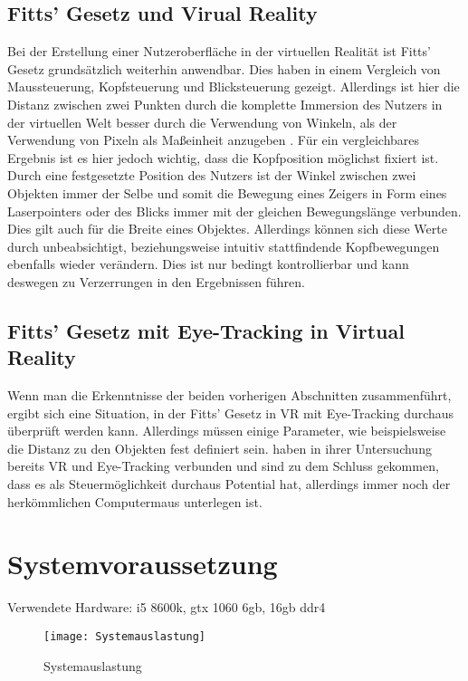 \subsection{Fitts' Gesetz und Virual Reality}
Bei der Erstellung einer Nutzeroberfläche in der virtuellen Realität ist Fitts' Gesetz grundsätzlich weiterhin anwendbar. Dies haben \citeauthor{Hansen.2018} in einem Vergleich von Maussteuerung, Kopfsteuerung und Blicksteuerung gezeigt.\cite{Hansen.2018} Allerdings ist hier die Distanz zwischen zwei Punkten durch die komplette Immersion des Nutzers in der virtuellen Welt besser durch die Verwendung von Winkeln, als der Verwendung von Pixeln als Maßeinheit anzugeben \cite{Hansen.2018}. Für ein vergleichbares Ergebnis ist es hier jedoch wichtig, dass die Kopfposition möglichst fixiert ist. Durch eine festgesetzte Position des Nutzers ist der Winkel zwischen zwei Objekten immer der Selbe und somit die Bewegung eines Zeigers in Form eines Laserpointers oder des Blicks immer mit der gleichen Bewegungslänge verbunden. Dies gilt auch für die Breite eines Objektes. Allerdings können sich diese Werte durch unbeabsichtigt, beziehungsweise intuitiv stattfindende Kopfbewegungen ebenfalls wieder verändern. Dies ist nur bedingt kontrollierbar und kann deswegen zu Verzerrungen in den Ergebnissen führen. 

\subsection{Fitts' Gesetz mit Eye-Tracking in Virtual Reality}
Wenn man die Erkenntnisse der beiden vorherigen Abschnitten zusammenführt, ergibt sich eine Situation, in der Fitts' Gesetz in VR mit Eye-Tracking durchaus überprüft werden kann. Allerdings müssen einige Parameter, wie beispielsweise die Distanz zu den Objekten fest definiert sein. \citeauthor{Hansen.2018} haben in ihrer Untersuchung bereits VR und Eye-Tracking verbunden und sind zu dem Schluss gekommen, dass es als Steuermöglichkeit durchaus Potential hat, allerdings immer noch der herkömmlichen Computermaus unterlegen ist. \cite{Hansen.2018}

\section{Systemvoraussetzung}
Verwendete Hardware: i5 8600k, gtx 1060 6gb, 16gb ddr4

\begin{figure}[!htbp]
	\centering
	\texttt{[image: Systemauslastung]}
	\caption[Systemauslastung]{Systemauslastung}
	\label{fig:Systemauslastung}
\end{figure}